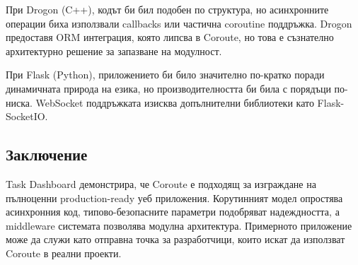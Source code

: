 При Drogon (C++), кодът би бил подобен по структура, но асинхронните операции биха използвали callbacks или частична coroutine поддръжка. Drogon предоставя ORM интеграция, която липсва в Coroute, но това е съзнателно архитектурно решение за запазване на модулност.

При Flask (Python), приложението би било значително по-кратко поради динамичната природа на езика, но производителността би била с порядъци по-ниска. WebSocket поддръжката изисква допълнителни библиотеки като Flask-SocketIO.

\subsection{Заключение}

Task Dashboard демонстрира, че Coroute е подходящ за изграждане на пълноценни production-ready уеб приложения. Корутинният модел опростява асинхронния код, типово-безопасните параметри подобряват надеждността, а middleware системата позволява модулна архитектура. Примерното приложение може да служи като отправна точка за разработчици, които искат да използват Coroute в реални проекти.
